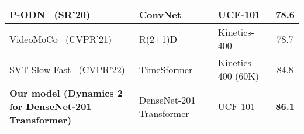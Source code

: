 \documentclass[fleqn,10pt]{wlscirep}
\begin{document}
\begin{table}[!htb]
{\begin{tabular}{|l|l|l|c|}
P-ODN~\cite{shu2020p} (SR'20)                                          & ConvNet                   & UCF-101                   & 78.6                            \\ \hline
VideoMoCo~\cite{pan2021videomoco} (CVPR'21)                            & R(2+1)D                   & Kinetics-400              & 78.7                            \\ \hline
SVT Slow-Fast~\cite{ranasinghe2022self} (CVPR'22)                                                & TimeSformer               & Kinetics-400 (60K)        & 84.8                            \\ \hline
\textbf{Our model (Dynamics 2 for DenseNet-201 Transformer)}           & DenseNet-201 Transformer  & UCF-101                   & \textbf{86.1}                   \\ \hline
\end{tabular}
}
\end{table} 
\end{document}
